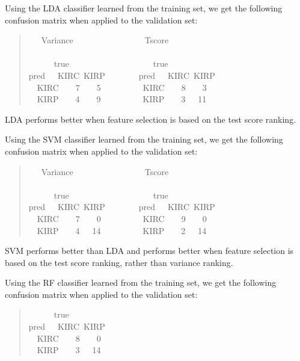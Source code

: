 Using the LDA classifier learned from the training set, we get the following
confusion matrix when applied to the validation set:

\begin{quote}{  \ttfamily \raggedright \noindent
\centering
~~~Variance~~~~~~~~~~~~~~~~~Tscore\\
~\\
~~~~~~true~~~~~~~~~~~~~~~~~~~~true\\
pred~~~KIRC~KIRP~~~~~~~~pred~~~KIRC~KIRP\\
~~KIRC~~~~7~~~~5~~~~~~~~~~KIRC~~~~8~~~~3\\
~~KIRP~~~~4~~~~9~~~~~~~~~~KIRP~~~~3~~~11\\
}
\end{quote}

LDA performs better when feature selection is based on the test score ranking.

Using the SVM classifier learned from the training set, we get the following
confusion matrix when applied to the validation set:

\begin{quote}{ \ttfamily \raggedright \noindent
\centering
~~~Variance~~~~~~~~~~~~~~~~~Tscore\\
~\\
~~~~~~true~~~~~~~~~~~~~~~~~~~~true\\
pred~~~KIRC~KIRP~~~~~~~~pred~~~KIRC~KIRP\\
~~KIRC~~~~7~~~~0~~~~~~~~~~KIRC~~~~9~~~~0\\
~~KIRP~~~~4~~~14~~~~~~~~~~KIRP~~~~2~~~14\\
}
\end{quote}

SVM performs better than LDA and performs better when feature selection is
based on the test score ranking, rather than variance ranking.

Using the RF classifier learned from the training set, we get the following
confusion matrix when applied to the validation set:

\begin{quote}{ \ttfamily \raggedright \noindent
\centering
~~~~~~true\\
pred~~~KIRC~KIRP\\
~~KIRC~~~~8~~~~0\\
~~KIRP~~~~3~~~14\\
}
\end{quote}

